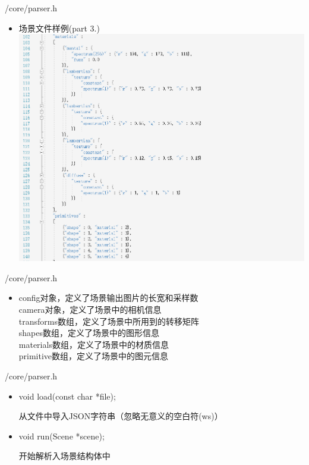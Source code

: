 \documentclass{beamer}
\begin{document}
\begin{frame} {/core/parser.h}
\begin{itemize}
\item
场景文件样例(part 3.) \\ 
\includegraphics[scale=0.3]{code3}
\end{itemize}
\end{frame}

\begin{frame} {/core/parser.h}
\begin{itemize}
\item config对象，定义了场景输出图片的长宽和采样数
\\ camera对象，定义了场景中的相机信息
\\ transforms数组，定义了场景中所用到的转移矩阵
\\ shapes数组，定义了场景中的图形信息
\\ materials数组，定义了场景中的材质信息
\\ primitive数组，定义了场景中的图元信息
\end{itemize}
\end{frame}

\begin{frame} {/core/parser.h}
\begin{itemize}
\item \begin{semiverbatim} void load(const char *file); \end{semiverbatim}
从文件中导入JSON字符串（忽略无意义的空白符(ws)）
\item \begin{semiverbatim} void run(Scene *scene); \end{semiverbatim}
开始解析入场景结构体中
\end{itemize}
\end{frame}
\end{document}
